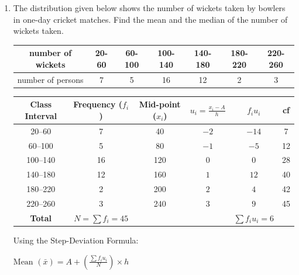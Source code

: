 \begin{enumerate}[label=\thesubsection.\arabic*, ref=\thesubsection.\theenumi]
	\begin{align}
		P(x)= Q(x)Y(x)+R(x) \implies p(x)=2x^3-3x^2+6x+7
	\end{align}
	
	$Y(x)= x^2-4x+8  \implies R(x)= 10x-33$
	
	$P(x)- R(x)= 2x^3-3x^2 -4x+40  $ is divisible by $ x^2-4x+8$

	
	\item The distribution given below shows the number of wickets taken by bowlers in one-day cricket matches. Find the mean and the median of the number of wickets taken.
	
		\begin{tabular}{c|c|c|c|c|c|c}
		
		\hline
		number of wickets & 20-60 & 60-100 & 100-140 & 140-180 & 180-220 & 220-260 \\ 
		\hline 
		
		number of persons & 7 & 5&16&12&2 &3\\ \hline  
		
		
	\end{tabular}
	
	
	\solution
	
	\begin{center}
		\begin{tabular}{cccccc}
			\hline
			\textbf{Class Interval} & \textbf{Frequency ($f_i$)} & \textbf{Mid-point ($x_i$)} & $u_i = \frac{x_i - A}{h}$ & $f_i u_i$  & cf \\
			\hline
			20--60   & 7  & 40  & $-2$ & $-14$ & 7 \\
			60--100  & 5  & 80  & $-1$ & $-5$ &12 \\
			100--140 & 16 & 120 & $0$  & $0$   & 28\\
			140--180 & 12 & 160 & $1$  & $12$   & 40\\
			180--220 & 2  & 200 & $2$  & $4$   & 42 \\
			220--260 & 3  & 240 & $3$  & $9$  & 45 \\
			\hline
			\textbf{Total} & $N = \sum f_i = 45$ & & & $\sum f_i u_i = 6$  & \\
			\hline
		\end{tabular}
	\end{center}
	
	
	
	Using the Step-Deviation Formula:
	\begin{center}
	$\text{Mean } (\bar{x}) = A + \left( \frac{\sum f_i u_i}{N} \right) \times h$
	\end{center}
	

\end{enumerate}
